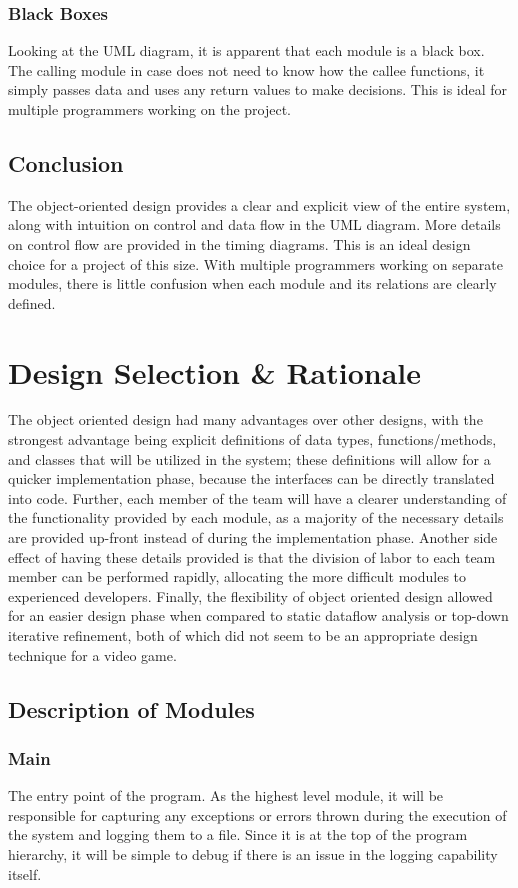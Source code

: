 \documentclass{article}
\begin{document}
		\subsubsection{Black Boxes}
			Looking at the UML diagram, it is apparent that each module is a black box. The calling module in case does not need to know how the callee functions, it simply passes data and uses any return values to make decisions. This is ideal for multiple programmers working on the project.
	\subsection{Conclusion}
		The object-oriented design provides a clear and explicit view of the entire system, along with intuition on control and data flow in the UML diagram. More details on control flow are provided in the timing diagrams. This is an ideal design choice for a project of this size. With multiple programmers working on separate modules, there is little confusion when each module and its relations are clearly defined.
%
%
\section{Design Selection \& Rationale}
The object oriented design had many advantages over other designs, with the strongest advantage being explicit definitions of data types, functions/methods, and classes that will be utilized in the system; these definitions will allow for a quicker implementation phase, because the interfaces can be directly translated into code. Further, each member of the team will have a clearer understanding of the functionality provided by each module, as a majority of the necessary details are provided up-front instead of during the implementation phase. Another side effect of having these details provided is that the division of labor to each team member can be performed rapidly, allocating the more difficult modules to experienced developers. Finally, the flexibility of object oriented design allowed for an easier design phase when compared to static dataflow analysis or top-down iterative refinement, both of which did not seem to be an appropriate design technique for a video game.

  \subsection{Description of Modules}
    \subsubsection{Main}
      The entry point of the program. As the highest level module, it will be responsible for capturing any exceptions or errors thrown during the execution of the system and logging them to a file. Since it is at the top of the program hierarchy, it will be simple to debug if there is an issue in the logging capability itself.
\end{document}
